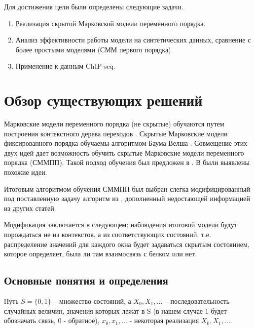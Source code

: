 \documentclass{matmex-diploma-custom}
\begin{document}
Для достижения цели были определены следующие задачи.
\begin{enumerate}
\item
Реализация скрытой Марковской модели
переменного порядка.
\item
Анализ эффективности работы модели на синтетических
данных, сравнение с более простыми моделями (СММ
первого порядка)
\item
Применение к данным ChIP-seq.
\end{enumerate}


\section{Обзор существующих решений}
Марковские модели переменного порядка (не скрытые) обучаются путем построения контекстного дерева переходов \cite{Buhlmann1999}. Скрытые Марковские модели фиксированного порядка обучаемы алгоритмом Баума-Велша \cite{Rabiner1989}.
Совмещение этих двух идей дает возможность обучить скрытые Марковские модели переменного порядка (СММПП). Такой подход обучения был предложен в \cite{Wang2006}. В \cite{Dumont2014} были выявлены похожие идеи.

Итоговым алгоритмом обучения СММПП был выбран слегка модифицированный под поставленную задачу алгоритм  из \cite{Wang2006}, дополненный недостающей информацией из других статей.

Модификация заключается в следующем: наблюдения итоговой модели будут порождаться не из контекстов, а из соответствующих состояний, т.е. распределение значений для каждого окна будет задаваться скрытым состоянием, которое определяет, была ли там взаимосвязь с белком или нет. 

\subsection{Основные понятия и определения}

Путь $ S = \{0, 1\} $ -- множество состояний, а $X_0, X_1, \ldots $ -- последовательность случайных величин, значения которых лежат в S (в нашем случае 1 будет обозначать связь, 0 - обратное), $x_0, x_1, \ldots$ - некоторая реализация $X_0, X_1, \ldots $.
\end{document}
